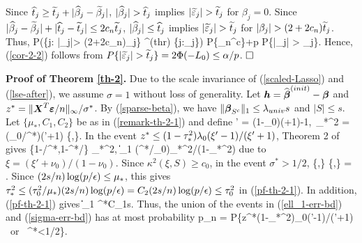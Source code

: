 \documentclass[11pt]{amsart}
\def\tveps{{\widetilde \veps}}
\begin{document}
Since $\widehat{t}_j\ge\widetilde{t}_j+|\widehat{\beta}_j-\widetilde{\beta}_j|$, 
$|\hbeta_j|>\that_j$ implies $|\tveps_j| > \ttil_j$ for $\beta_j=0$.  
Since $|\widehat{\beta}_j-\widetilde{\beta}_j|+|\widehat{t}_j-\widetilde{t}_j|\le 2{c}_n\widetilde{t}_j$, 
$|\widehat{\beta}_j|\le \widehat{t}_j$ implies $|\tveps_j| > \ttil_j$ for $|\beta_j|>(2+2{c}_n)\ttil_j$. Thus, 
\bes
P\Big(\{j: |\beta_j|> (2+2{c}_n)\ttil_j\} \subseteq \Shat^{(thr)} \subseteq \{j:\beta_j\}\Big)
\ge P\{\Omega_n^c\}+p P\{|\tveps_j| > \ttil_j\}. 
\ees
Hence, (\ref{cor-2-2}) follows from $P\{|\tveps_j| > \ttil_j\}=2\Phi(-L_0)\le \alpha/p$. $\hfill\square$ 
 
\medskip
{\bf Proof of Theorem \ref{th-2}.} Due to the scale invariance of (\ref{scaled-Lasso}) and (\ref{lse-after}), 
we assume $\sigma=1$ without loss of generality. 
Let $\boldsymbol{h}={\widehat{\boldsymbol{\beta}}}^{(init)}-\boldsymbol{\beta}$ and $z^*=\|\boldsymbol{X}^T\boldsymbol{\varepsilon}/n\|_\infty/\sigma^*$. 
By (\ref{sparse-beta}), we have $\|\boldsymbol{\beta}_{S^c}\|_1\le\lambda_{univ}s$ and $|S|\le s$. 
Let $\{\mu_*,C_1,C_2\}$ be as in (\ref{remark-th-2-1}) and define  
\bes
\xi' = (1-\nu_0)(\xi+1)-1,\ 
\tau_*^2 = (\lam_0/\sigma^*)(\xi'+1)
\max\Big\{,\Big\}. 
\ees
In the event $z^*\le (1-\tau_*^2)\lambda_0(\xi'-1)/(\xi'+1)$, Theorem 2 of \cite{SunZ11} gives 
\bel{pf-th-2-1}
\max\{1-\hsigma/\sigma^*,1-\sigma^*/\hsigma\} \le \tau_*^2,\ 
\|\bh\|_1 \le (\sigma^*/\lam_0)\tau_*^2/(1-\tau_*^2) 
\eel
due to $\xi = (\xi'+\nu_0)/(1-\nu_0)$. 
Since $\kappa^2(\xi,S)\ge {c}_0$, in the event $\sigma^*>1/2$, 
\bes
\frac{\tau_*^2}{\xi+1} 
\le \max\Big\{,\Big\}
\le \max\Big\{,\Big\}
= \frac{\tau_0^2\lam_0^2s}{A^2(1+\xi)\mu_*}.
\ees
Since $(2s/n)\log(p/\epsilon)\le \mu_*$, this gives $\tau_*^2 \le (\tau_0^2/\mu_*)(2s/n)\log(p/\epsilon)
=C_2(2s/n)\log(p/\epsilon)\le\tau_0^2$ in (\ref{pf-th-2-1}). 
In addition, (\ref{pf-th-2-1}) gives 
\bes
\|\bh\|_1\le {}
\le {}
\le \sigma^*C_1s\sqrt{(2/n)\log(p/\eps)}. 
\ees
Thus, the union of the events in (\ref{ell_1-err-bd}) and (\ref{sigma-err-bd}) has at most probability 
\bes
p_n = P\big\{z^*\ge (1-\tau_*^2)\lam_0(\xi'-1)/(\xi'+1) \hbox{ or } \sigma^*<1/2\big\}. 
\ees
\end{document}
